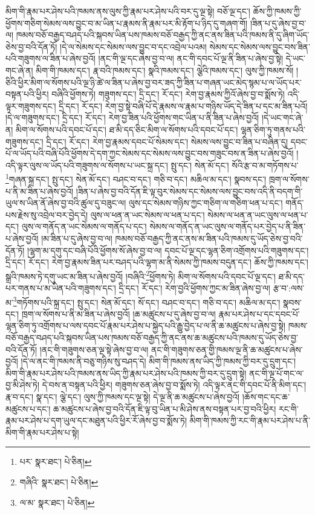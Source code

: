 མིག་གི་རྣམ་པར་ཤེས་པའི་ཁམས་ནས་ལུས་ཀྱི་རྣམ་པར་ཤེས་པའི་བར་དུ་ལྔ་སྟེ། བཅོ་ལྔ་དང་། ཆོས་ཀྱི་ཁམས་ཀྱི་ཕྱོགས་གཅིག་སེམས་ལས་བྱུང་བ་མ་ཡིན་པ་རྣམས་ནི་རྣམ་པར་མི་རྟོག་པ་ཉིད་དུ་གཞག་གོ། །ཟིན་པ་དུ་ཞེས་བྱ་བ་ལ། ཁམས་བཅོ་བརྒྱད་བཤད་པའི་སྐབས་ཡིན་པས་ཁམས་བཅོ་བརྒྱད་ཀྱི་ནང་ནས་ཟིན་པའི་ཁམས་ནི་དུ་ཞིག་ཡོད་ཅེས་བྱ་བའི་དོན་ཏོ། །དེ་ལ་སེམས་དང་སེམས་ལས་བྱུང་བ་དང་འབྲེལ་པའམ། སེམས་དང་སེམས་ལས་བྱུང་བས་ཟིན་པའི་གཟུགས་ལ་ཟིན་པ་ཞེས་བྱའོ། །ནང་གི་ལྔ་དང་ཞེས་བྱ་བ་ལ། ནང་གི་དབང་པོ་ལྔ་ནི་ཟིན་པ་ཞེས་བྱ་སྟེ། དེ་ཡང་གང་ཞེ་ན། མིག་གི་ཁམས་དང་། རྣ་བའི་ཁམས་དང་། སྣའི་ཁམས་དང་། ལྕེའི་ཁམས་དང་། ལུས་ཀྱི་ཁམས་སོ། །ཅིའི་ཕྱིར་མིག་ལ་སོགས་པའི་ལྔ་ཉི་ཚེ་ལ་ཟིན་པ་ཞེས་བྱ་བར་ཟད་ཀྱི་ཟིན་པ་གཞན་ཡང་མེད་སྙམ་པ་ལ་ཡོད་པར་བསྟན་པའི་ཕྱིར། བཞིའི་ཕྱོགས་ཏེ། གཟུགས་དང་། དྲི་དང་། རོ་དང་། རེག་བྱ་རྣམས་ཀྱིའོ་ཞེས་བྱ་བ་སྨོས་ཏེ། འདི་ལྟར་གཟུགས་དང་། དྲི་དང་། རོ་དང་། རེག་བྱ་སྟེ་བཞི་པོ་དེ་རྣམས་ལ་རྣམ་པ་གཉིས་ཡོད་དེ་ཟིན་པ་དང་མ་ཟིན་པའོ། །དེ་ལ་གཟུགས་དང་། དྲི་དང་། རོ་དང་། རེག་བྱ་ཟིན་པའི་ཕྱོགས་གང་ཡིན་པ་ནི་ཟིན་པ་ཞེས་བྱའོ། །དེ་ཡང་གང་ཞེ་ན། མིག་ལ་སོགས་པའི་དབང་པོ་དང་། ཐ་མི་དད་ཅིང་མིག་ལ་སོགས་པའི་དབང་པོ་དང་། ལྷན་ཅིག་ཏུ་གནས་པའི་གཟུགས་དང་། དྲི་དང་། རོ་དང་། རེག་བྱ་རྣམས་དབང་པོ་སེམས་དང་། སེམས་ལས་བྱུང་བ་ཟིན་པ་བཞིན་དུ། དབང་པོ་ལ་ཡོད་པའི་བཞི་པོའི་ཕྱོགས་དེ་དག་ཀྱང་སེམས་དང་སེམས་ལས་བྱུང་བས་གཟུང་བས་ན་ཟིན་པ་ཞེས་བྱའོ། །འདི་ལྟར་ལུས་ལ་ཡོད་པའི་གཟུགས་ལ་སོགས་པ་ཡང་སྐྲ་དང་། སྤུ་དང་། སེན་མོ་དང་། སོའི་རྩ་བ་མ་གཏོགས་པ་\footnote{པར་  སྣར་ཐང་།  པེ་ཅིན། }གཞན་སྐྲ་དང་། སྤུ་དང་། སེན་མོ་དང་། བཤང་བ་དང་། གཅི་བ་དང་། མཆིལ་མ་དང་། སྣབས་དང་། ཁྲག་ལ་སོགས་པ་ནི་མ་ཟིན་པ་ཞེས་བྱའོ། །ཟིན་པ་ཞེས་བྱ་བའི་དོན་ཇི་ལྟ་བུར་སེམས་དང་སེམས་ལས་བྱུང་བས་འདི་ནི་བདག་གི་ཡུལ་ས་ཡིན་ནོ་ཞེས་བྱ་བའི་ཚུལ་དུ་བཟུང་ལ། ལུས་དང་སེམས་གཉིས་ཀྱང་གཅིག་ལ་གཅིག་ཕན་པ་དང་། གནོད་པས་རྗེས་སུ་འབྲེལ་བར་བྱེད་དེ། ལུས་ལ་ཕན་ན་ཡང་སེམས་ལ་ཕན་པ་དང་། སེམས་ལ་ཕན་ན་ཡང་ལུས་ལ་ཕན་པ་དང་། ལུས་ལ་གནོད་ན་ཡང་སེམས་ལ་གནོད་པ་དང་། སེམས་ལ་གནོད་ན་ཡང་ལུས་ལ་གནོད་པར་བྱེད་པ་ནི་ཟིན་པ་ཞེས་བྱའོ། །མ་ཟིན་པ་དུ་ཞེས་བྱ་བ་ལ། ཁམས་བཅོ་བརྒྱད་ཀྱི་ནང་ནས་མ་ཟིན་པའི་ཁམས་དུ་ཡོད་ཅེས་བྱ་བའི་དོན་ཏོ། །ལྷག་མ་དགུ་དང་བཞི་པོའི་ཕྱོགས་སོ་ཞེས་བྱ་བ་ལ། དབང་པོ་ལྔ་དང་ལྷན་ཅིག་འགྲོགས་པའི་གཟུགས་དང་། དྲི་དང་། རོ་དང་། རེག་བྱ་རྣམས་ཟིན་པར་བཤད་པའི་ལྷག་མ་ནི་སེམས་ཀྱི་ཁམས་བདུན་དང་། ཆོས་ཀྱི་ཁམས་དང་། སྒྲའི་ཁམས་ཏེ་དགུ་ཡང་མ་ཟིན་པ་ཞེས་བྱའོ། །བཞིའི་\footnote{གཞིའི་  སྣར་ཐང་།  པེ་ཅིན། }ཕྱོགས་ཏེ། མིག་ལ་སོགས་པའི་དབང་པོ་ལྔ་དང་། ཐ་མི་དད་པར་གནས་པ་མ་ཡིན་པའི་གཟུགས་དང་། དྲི་དང་། རོ་དང་། རེག་བྱའི་ཕྱོགས་ཀྱང་མ་ཟིན་ཞེས་བྱ་ལ། རྩ་བ་:ལས་མ་\footnote{ལ་མ་  སྣར་ཐང་།  པེ་ཅིན། }གཏོགས་པའི་སྐྲ་དང་། སྤུ་དང་། སེན་མོ་དང་། སོ་དང་། བཤང་བ་དང་། གཅི་བ་དང་། མཆིལ་མ་དང་། སྣབས་དང་། ཁྲག་ལ་སོགས་པ་ནི་མ་ཟིན་པ་ཞེས་བྱའོ། །ཆ་མཚུངས་པ་དུ་ཞེས་བྱ་བ་ལ། རྣམ་པར་ཤེས་པ་དང་དབང་པོ་ལྷན་ཅིག་ཏུ་འགྲོགས་པ་ལས་དབང་པོ་རྣམ་པར་ཤེས་པ་སྐྱེད་པའི་རྒྱུ་བྱེད་པ་ལ་ནི་ཆ་མཚུངས་པ་ཞེས་བྱ་སྟེ། ཁམས་བཅོ་བརྒྱད་བཤད་པའི་སྐབས་ཡིན་པས་ཁམས་བཅོ་བརྒྱད་ཀྱི་ནང་ནས་ཆ་མཚུངས་པའི་ཁམས་དུ་ཡོད་ཅེས་བྱ་བའི་དོན་ཏོ། །ནང་གི་གཟུགས་ཅན་ལྔ་སྟེ་ཞེས་བྱ་བ་ལ། ནང་གི་གཟུགས་ཅན་གྱི་ཁམས་ལྔ་ནི་ཆ་མཚུངས་པ་ཞེས་བྱའོ། །དེ་ལ་ནང་གི་ཁམས་ནི་བཅུ་གཉིས་སུ་བཤད་དེ། མིག་གི་ཁམས་ནས་ཡིད་ཀྱི་ཁམས་ཀྱི་བར་དུ་དྲུག་དང་། མིག་གི་རྣམ་པར་ཤེས་པའི་ཁམས་ནས་ཡིད་ཀྱི་རྣམ་པར་ཤེས་པའི་ཁམས་ཀྱི་བར་དུ་དྲུག་སྟེ། ནང་གི་ལྔ་པོ་གང་ལ་བྱ་མི་ཤེས་ཏེ། དེ་བས་ན་བསྟན་པའི་ཕྱིར། གཟུགས་ཅན་ཞེས་བྱ་བ་སྨོས་ཏེ། འདི་ལྟར་ནང་གི་དབང་པོ་ནི་མིག་དང་། རྣ་བ་དང་། སྣ་དང་། ལྕེ་དང་། ལུས་ཀྱི་ཁམས་དང་ལྔ་སྟེ། དེ་ལྔ་ནི་ཆ་མཚུངས་པ་ཞེས་བྱའོ། །ཆོས་གང་དང་ཆ་མཚུངས་པ་དང་། ཆ་མཚུངས་པ་ཞེས་བྱ་བའི་དོན་ཇི་ལྟ་བུ་ཡིན་པ་མི་ཤེས་ནས་བསྟན་པར་བྱ་བའི་ཕྱིར། རང་གི་རྣམ་པར་ཤེས་པ་དག་ཡུལ་དང་མཐུན་པའི་ཕྱིར་རོ་ཞེས་བྱ་བ་སྨོས་ཏེ། མིག་གི་ཁམས་ཀྱི་རང་གི་རྣམ་པར་ཤེས་པ་ནི་མིག་གི་རྣམ་པར་ཤེས་པ་སྟེ། 